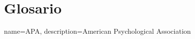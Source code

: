 \chapter{Glosario}

{
    name=APA,
    description={American Psychological Association}
}
\printglossary